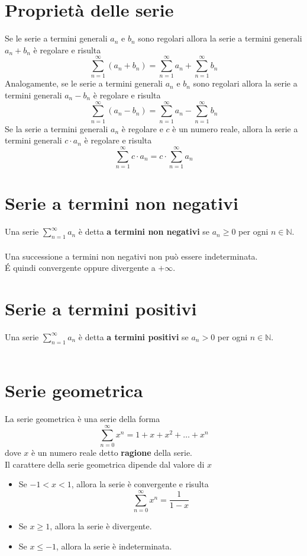 \documentclass{article}
\begin{document}
\section*{Proprietà delle serie}
Se le serie a termini generali $a_n$ e $b_n$ sono regolari allora la serie a termini generali $a_n + b_n$ è regolare e risulta
\begin{equation*}
    \sum_{n=1}^\infty (a_n + b_n) = \sum_{n=1}^\infty a_n + \sum_{n=1}^\infty b_n
\end{equation*}
Analogamente, se le serie a termini generali $a_n$ e $b_n$ sono regolari allora la serie a termini generali $a_n - b_n$ è regolare e risulta
\begin{equation*}
    \sum_{n=1}^\infty (a_n - b_n) = \sum_{n=1}^\infty a_n - \sum_{n=1}^\infty b_n
\end{equation*}
Se la serie a termini generali $a_n$ è regolare e $c$ è un numero reale, allora la serie a termini generali $c \cdot a_n$ è regolare e risulta
\begin{equation*}
    \sum_{n=1}^\infty c \cdot a_n = c \cdot \sum_{n=1}^\infty a_n
\end{equation*}
\section*{Serie a termini non negativi}
Una serie $\sum_{n=1}^\infty a_n$ è detta \textbf{a termini non negativi} se $a_n \geq 0$ per ogni $n \in \mathbb{N}$.\\\\
Una successione a termini non negativi non può essere indeterminata.\\
É quindi convergente oppure divergente a $+\infty$.
\section*{Serie a termini positivi}
Una serie $\sum_{n=1}^\infty a_n$ è detta \textbf{a termini positivi} se $a_n > 0$ per ogni $n \in \mathbb{N}$.\\\\
\newpage
\section*{Serie geometrica}
La serie geometrica è una serie della forma
\begin{equation*}
    \sum_{n=0}^\infty x^n = 1 + x + x^2 + \dots + x^n
\end{equation*}
dove $x$ è un numero reale detto \textbf{ragione} della serie.\\
Il carattere della serie geometrica dipende dal valore di $x$
\begin{itemize}
    \item Se $-1<x< 1$, allora la serie è convergente e risulta
          \begin{equation*}
              \sum_{n=0}^\infty x^n = \frac{1}{1-x}
          \end{equation*}
    \item Se $x \geq 1$, allora la serie è divergente.
    \item Se $x \leq -1$, allora la serie è indeterminata.
\end{itemize}
\end{document}
